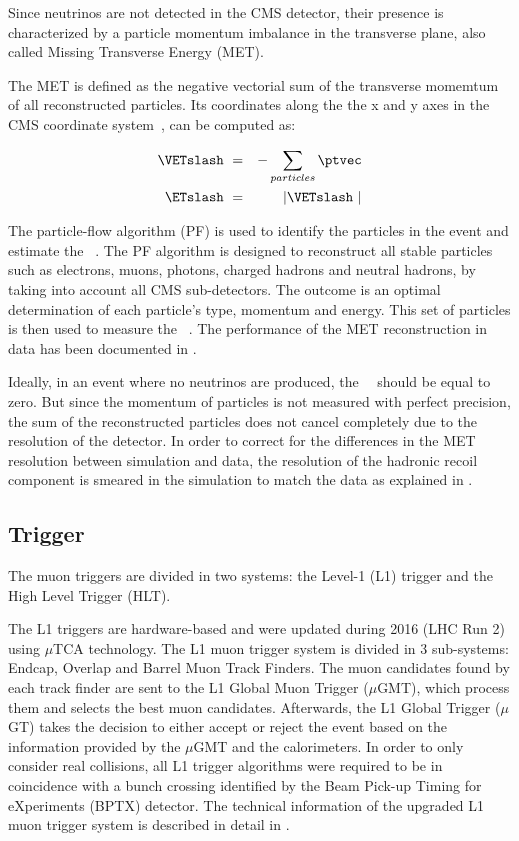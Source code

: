 Since neutrinos are not detected in the CMS detector, their presence is characterized by a particle momentum imbalance in the transverse plane, also called Missing Transverse Energy (MET). 

The MET is defined as the negative vectorial sum of the transverse momemtum of all reconstructed particles. Its coordinates along the the x and y axes in the CMS coordinate system~\cite{CMS}, can be computed as:

\begin{eqnarray*} 
\VETslash\ &=& -\sum_{particles}\ptvec \\
\ETslash\ &=& \left|\VETslash\ \right|
\end{eqnarray*}

The particle-flow algorithm (PF) \cite{PF_Reco} is used to identify the particles in the event and estimate the \ETslash\ . The PF algorithm is designed to reconstruct all stable particles such as electrons, muons, photons, charged hadrons and neutral hadrons, by taking into account all CMS sub-detectors. The outcome is an optimal determination of each particle's type, momentum and energy. This set of particles is then used to measure the \VETslash\ . The performance of the MET reconstruction in \pp data has been documented in \cite{MET_Reco,MET_PERF}.

Ideally, in an event where no neutrinos are produced, the \ETslash\ \ should be equal to zero. But since the momentum of particles is not measured with perfect precision, the sum of the reconstructed particles \ptvec does not cancel completely due to the resolution of the detector. In order to correct for the differences in the MET resolution between simulation and data, the resolution of the hadronic recoil component is smeared in the simulation to match the data as explained in .


\subsection{Trigger} \label{sec:WBoson_Selection_Trigger}

The muon triggers are divided in two systems: the Level-1 (L1) trigger and the High Level Trigger (HLT). 

The L1 triggers are hardware-based and were updated during 2016 (LHC Run 2) using $\mu$TCA technology. The L1 muon trigger system is divided in 3 sub-systems: Endcap, Overlap and Barrel Muon Track Finders. The muon candidates found by each track finder are sent to the L1 Global Muon Trigger ($\mu$GMT), which process them and selects the best muon candidates. Afterwards, the L1 Global Trigger ($\mu$GT) takes the decision to either accept or reject the event based on the information provided by the $\mu$GMT and the calorimeters. In order to only consider real collisions, all \pPb L1 trigger algorithms were required to be in coincidence with a bunch crossing identified by the Beam Pick-up Timing for eXperiments (BPTX) detector. The technical information of the upgraded L1 muon trigger system is described in detail in \cite{L1_Muon_Stage2_Paper,L1_Muon_Stage2_Thesis}. 

